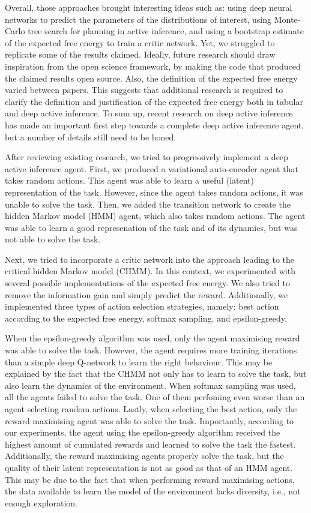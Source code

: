 \documentclass[twoside,11pt]{article}
\begin{document}
Overall, those approaches brought interesting ideas such as: using deep neural networks to predict the parameters of the distributions of interest, using Monte-Carlo tree search for planning in active inference, and using a bootstrap estimate of the expected free energy to train a critic network. Yet, we struggled to replicate some of the results claimed. Ideally, future research should draw inspiration from the open science framework, by making the code that produced the claimed results open source. Also, the definition of the expected free energy varied between papers. This suggests that additional research is required to clarify the definition and justification of the expected free energy both in tabular and deep active inference. To sum up, recent research on deep active inference \citep{DeepAIwithMCMC,DeepAI,rood2020deep,sancaktar2020endtoend,DAI_Kai,DAI_POMDP,ccatal2020learning} has made an important first step towards a complete deep active inference agent, but a number of details still need to be honed.

After reviewing existing research, we tried to progressively implement a deep active inference agent. First, we produced a variational auto-encoder agent that takes random actions. This agent was able to learn a useful (latent) representation of the task. However, since the agent takes random actions, it was unable to solve the task. Then, we added the transition network to create the hidden Markov model (HMM) agent, which also takes random actions. The agent was able to learn a good represenation of the task and of its dynamics, but was not able to solve the task.

Next, we tried to incorporate a critic network into the approach leading to the critical hidden Markov model (CHMM). In this context, we experimented with several possible implementations of the expected free energy. We also tried to remove the information gain and simply predict the reward. Additionally, we implemented three types of action selection strategies, namely: best action according to the expected free energy, softmax sampling, and epsilon-greedy.

When the epsilon-greedy algorithm was used, only the agent maximising reward was able to solve the task.
However, the agent requires more training iterations than a simple deep Q-network to learn the right behaviour.
This may be explained by the fact that the CHMM not only has to learn to solve the task, but also learn the dynamics of the environment.
When softmax sampling was used, all the agents failed to solve the task. One of them perfoming even worse than an agent selecting random actions.
Lastly, when selecting the best action, only the reward maximising agent was able to solve the task.
Importantly, according to our experiments, the agent using the epsilon-greedy algorithm received the highest amount of cumulated rewards and learned to solve the task the fastest.
Additionally, the reward maximising agents properly solve the task, but the quality of their latent representation is not as good as that of an HMM agent.
This may be due to the fact that when performing reward maximising actions, the data available to learn the model of the environment lacks diversity, i.e., not enough exploration.
\end{document}
